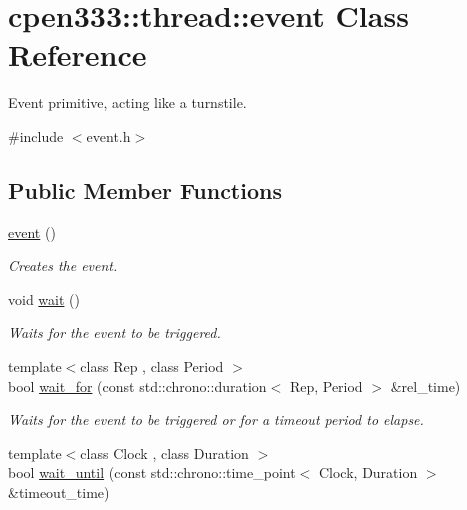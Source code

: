 \hypertarget{classcpen333_1_1thread_1_1event}{}\section{cpen333\+:\+:thread\+:\+:event Class Reference}
\label{classcpen333_1_1thread_1_1event}


Event primitive, acting like a turnstile.  




{\ttfamily \#include $<$event.\+h$>$}

\subsection*{Public Member Functions}
\begin{DoxyCompactItemize}
\item 
\mbox{\label{classcpen333_1_1thread_1_1event_a22e507616a649d1b0cfd534c495d3715}} 
\hyperlink{classcpen333_1_1thread_1_1event_a22e507616a649d1b0cfd534c495d3715}{event} ()
\begin{DoxyCompactList}\small\item\em Creates the event. \end{DoxyCompactList}\item 
void \hyperlink{classcpen333_1_1thread_1_1event_a041bc99b2749b269ac3853a4b8bba678}{wait} ()
\begin{DoxyCompactList}\small\item\em Waits for the event to be triggered. \end{DoxyCompactList}\item 
{\footnotesize template$<$class Rep , class Period $>$ }\\bool \hyperlink{classcpen333_1_1thread_1_1event_a200e1b4dff248be78cc1ae9c993dec02}{wait\+\_\+for} (const std\+::chrono\+::duration$<$ Rep, Period $>$ \&rel\+\_\+time)
\begin{DoxyCompactList}\small\item\em Waits for the event to be triggered or for a timeout period to elapse. \end{DoxyCompactList}\item 
{\footnotesize template$<$class Clock , class Duration $>$ }\\bool \hyperlink{classcpen333_1_1thread_1_1event_aeea6876ad13a451c66868849fa23ec16}{wait\+\_\+until} (const std\+::chrono\+::time\+\_\+point$<$ Clock, Duration $>$ \&timeout\+\_\+time)

\end{DoxyCompactItemize}
